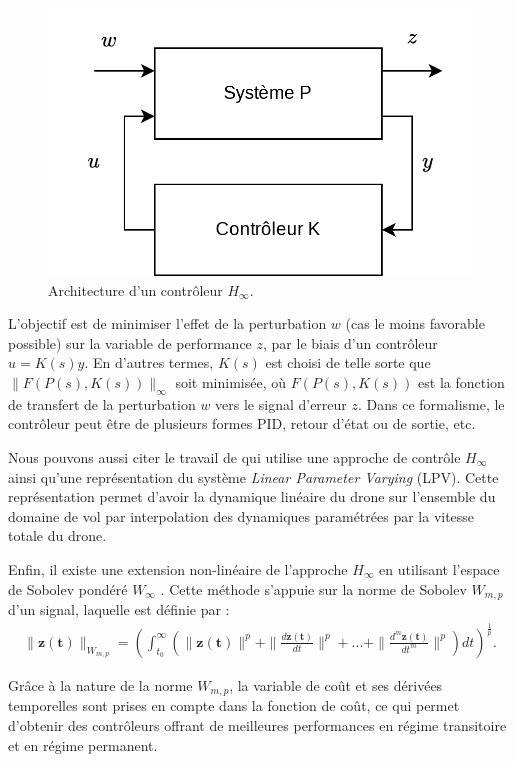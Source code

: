 \begin{figure}[ht!]
    \centerline{
    \includegraphics[trim=0cm 0cm 0cm 0cm,clip,width=0.5\columnwidth]{figures/lft.png}}
    \caption{Architecture d'un contrôleur $H_{\infty}$.}
    \label{fig:schemalft}
\end{figure}

L'objectif est de minimiser l'effet de la perturbation $w$  (cas le moins favorable possible) sur la variable de performance $z$, par le biais d'un contrôleur $u = K(s) y$. En d'autres termes, $K(s)$ est choisi de telle sorte que $\| F(P(s), K(s))\|_{\infty}$  soit minimisée, où $F(P(s), K(s))$ est la fonction de transfert de la perturbation $w$ vers le signal d'erreur $z$. 
Dans ce formalisme, le contrôleur peut être de plusieurs formes PID, retour d'état ou de sortie, etc.

Nous pouvons aussi citer le travail de \cite{SNYDER2021106621} qui utilise une approche de contrôle $H_{\infty}$ ainsi qu'une représentation du système \textit{Linear Parameter Varying} (LPV). Cette représentation permet d'avoir la dynamique linéaire du drone sur l'ensemble du domaine de vol par interpolation des dynamiques paramétrées par la vitesse totale du drone.

Enfin, il existe une extension non-linéaire de l'approche $H_{\infty}$ en utilisant l'espace de Sobolev pondéré $W_{\infty}$ \cite{cardoso2018nonlinear, CardosoEsteban2019, cardoso2021robust, cardoso2024robust}. Cette méthode s'appuie sur la norme de Sobolev $W_{m,p}$  d'un signal, laquelle est définie par :
\begin{align*}
    \|\boldsymbol{z(t)}\|_{W_{m,p}} = \left( \int_{t_{0}}^{\infty}(\|\boldsymbol{z(t)}\|^{p} + \|\frac{d \boldsymbol{z(t)}}{dt}\|^{p} + ... + \|\frac{d^{m} \boldsymbol{z(t)}}{dt^{m}}\|^{p}) dt \right)^{\frac{1}{p}}.
\end{align*}  

Grâce à la nature de la norme $W_{m,p}$, la variable de coût et ses dérivées temporelles sont prises en compte dans la fonction de coût, ce qui permet d'obtenir des contrôleurs offrant de meilleures performances en régime transitoire et en régime permanent.


